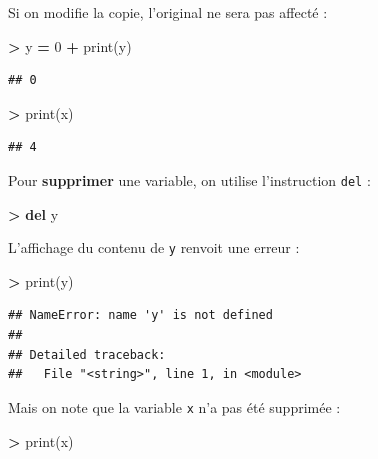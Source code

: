 \documentclass[12pt,]{book}
\newenvironment{Shaded}{\begin{snugshade}}{\end{snugshade}}
\newcommand{\KeywordTok}[1]{\textcolor[rgb]{0.13,0.29,0.53}{\textbf{#1}}}
\newcommand{\DecValTok}[1]{\textcolor[rgb]{0.00,0.00,0.81}{#1}}
\newcommand{\OperatorTok}[1]{\textcolor[rgb]{0.81,0.36,0.00}{\textbf{#1}}}
\newcommand{\BuiltInTok}[1]{#1}
\newcommand{\NormalTok}[1]{#1}
\numberwithin{equation}{section}
\numberwithin{countremarque}{section}
\begin{document}
Si on modifie la copie, l'original ne sera pas affecté :

\begin{Shaded}
\begin{Highlighting}[]
\OperatorTok{>}\NormalTok{ y }\OperatorTok{=} \DecValTok{0}
\OperatorTok{+} \BuiltInTok{print}\NormalTok{(y)}
\end{Highlighting}
\end{Shaded}

\begin{lstlisting}
## 0
\end{lstlisting}

\begin{Shaded}
\begin{Highlighting}[]
\OperatorTok{>} \BuiltInTok{print}\NormalTok{(x)}
\end{Highlighting}
\end{Shaded}

\begin{lstlisting}
## 4
\end{lstlisting}

Pour \textbf{supprimer} une variable, on utilise l'instruction
\texttt{del} :

\begin{Shaded}
\begin{Highlighting}[]
\OperatorTok{>} \KeywordTok{del}\NormalTok{ y}
\end{Highlighting}
\end{Shaded}

L'affichage du contenu de \texttt{y} renvoit une erreur :

\begin{Shaded}
\begin{Highlighting}[]
\OperatorTok{>} \BuiltInTok{print}\NormalTok{(y)}
\end{Highlighting}
\end{Shaded}

\begin{lstlisting}
## NameError: name 'y' is not defined
## 
## Detailed traceback: 
##   File "<string>", line 1, in <module>
\end{lstlisting}

Mais on note que la variable \texttt{x} n'a pas été supprimée :

\begin{Shaded}
\begin{Highlighting}[]
\OperatorTok{>} \BuiltInTok{print}\NormalTok{(x)}
\end{Highlighting}
\end{Shaded}
\end{document}
